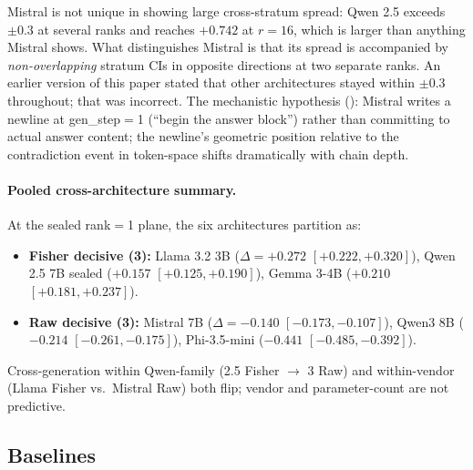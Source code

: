 \documentclass[10pt, letterpaper]{article}
\begin{document}
Mistral is not unique in showing large cross-stratum spread: Qwen 2.5
exceeds $\pm 0.3$ at several ranks and reaches $+0.742$ at $r=16$,
which is larger than anything Mistral shows. What distinguishes
Mistral is that its spread is accompanied by \emph{non-overlapping}
stratum CIs in opposite directions at two separate ranks. An earlier
version of this paper stated that other architectures stayed within
$\pm 0.3$ throughout; that was incorrect. The mechanistic hypothesis
(): Mistral writes a newline at gen\_step$=$1
(``begin the answer block'') rather than committing to actual answer
content; the newline's geometric position relative to the
contradiction event in token-space shifts dramatically with chain
depth.

\paragraph{Pooled cross-architecture summary.}
At the sealed rank$=$1 plane, the six architectures partition as:

\begin{itemize}[leftmargin=*, itemsep=2pt, topsep=2pt]
  \item \textbf{Fisher decisive (3):} Llama 3.2 3B
  ($\Delta = +0.272$ $[+0.222, +0.320]$), Qwen 2.5 7B sealed
  ($+0.157$ $[+0.125, +0.190]$), Gemma 3-4B ($+0.210$ $[+0.181,
  +0.237]$).
  \item \textbf{Raw decisive (3):} Mistral 7B
  ($\Delta = -0.140$ $[-0.173, -0.107]$), Qwen3 8B
  ($-0.214$ $[-0.261, -0.175]$), Phi-3.5-mini
  ($-0.441$ $[-0.485, -0.392]$).
\end{itemize}

Cross-generation within Qwen-family (2.5 Fisher $\to$ 3 Raw) and
within-vendor (Llama Fisher vs.\ Mistral Raw) both flip; vendor and
parameter-count are not predictive.

\subsection{Baselines}
\label{sec:results:baselines}
\end{document}
